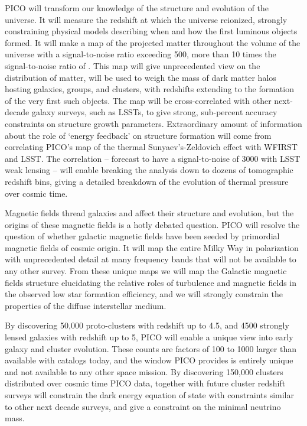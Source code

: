 \documentclass[PICOReport.tex]{subfiles}
\begin{document}
PICO will transform our knowledge of the structure and evolution of the universe. It will measure the redshift at which the universe reionized, strongly constraining physical models describing when and how the first luminous objects formed. It will make a map of the projected matter throughout the volume of the universe with a signal-to-noise ratio exceeding 500, more than 10 times the signal-to-noise ratio of \planck. This map will give unprecedented view on the distribution of matter, will be used to weigh the mass of dark matter halos hosting galaxies, groups, and clusters, with redshifts extending to the formation of the very first such objects. The map will be cross-correlated with other next-decade galaxy surveys, such as LSSTs, to give strong, sub-percent accuracy constraints on structure growth parameters.  Extraordinary amount of information about the role of `energy feedback' on structure formation will come from correlating PICO's map of the thermal Sunyaev's-Zeldovich effect with WFIRST and LSST. The correlation -- forecast to have a signal-to-noise of 3000 with LSST weak lensing -- will enable breaking the analysis down to dozens of tomographic redshift bins, giving a detailed breakdown of the evolution of thermal pressure over cosmic time. 

Magnetic fields thread galaxies and affect their structure and evolution, but the origins of these magnetic fields is a hotly debated question. PICO will resolve the question of whether galactic magnetic fields have been seeded by primordial magnetic fields of cosmic origin. It will map the entire Milky Way in polarization with unprecedented detail at many frequency bands that will not be available to any other survey. From these unique maps we will map the Galactic magnetic fields structure elucidating the relative roles of turbulence and magnetic fields in the observed low star formation efficiency, and we will strongly constrain the properties of the diffuse interstellar medium. 

By discovering 50,000 proto-clusters with redshift up to 4.5, and  4500 strongly lensed galaxies with redshift up to 5, PICO will enable a unique view into early galaxy and cluster evolution. These counts are factors of 100 to 1000 larger than available with catalogs today, and the window PICO provides is entirely unique and not available to any other space mission. By discovering 150,000 clusters distributed over cosmic time PICO data, together with future cluster redshift surveys will constrain the dark energy equation of state with constraints similar to other next decade surveys, and give a constraint on the minimal neutrino mass. 
\end{document}
